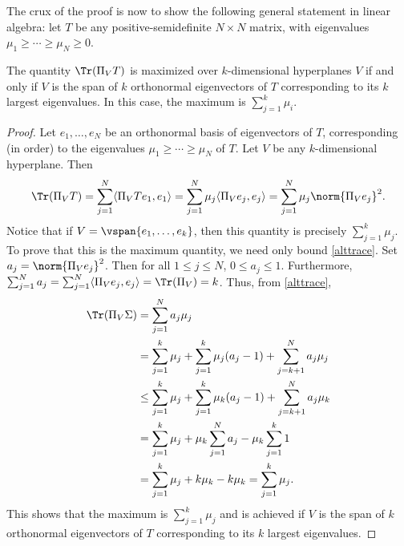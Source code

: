 \documentclass[12pt]{article}
\begin{document}
The crux of the proof is now to show the following general statement in linear algebra: let $T$ be any positive-semidefinite $N\times N$ matrix, with eigenvalues $\mu_1 \geq \cdots \geq \mu_N \geq 0$.
 \begin{prop} The quantity $\Tr(\Pi_V T)$ is maximized over $k$-dimensional hyperplanes $V$ if and only if $V$ is the span of $k$ orthonormal eigenvectors of $T$ corresponding to its $k$ largest eigenvalues. In this case, the maximum is $\sum_{j=1}^k \mu_i$.\end{prop}
 \begin{proof}
 Let $e_1,\ldots,e_N$ be an orthonormal basis of eigenvectors of $T$, corresponding (in order) to the eigenvalues $\mu_1 \geq \cdots \geq \mu_N$ of $T$. Let $V$ be any $k$-dimensional hyperplane. 
 Then 
 \begin{equation}\label{alttrace}\Tr(\Pi_V T) = \sum_{j=1}^N \langle \Pi_V T e_1,e_1\rangle = \sum_{j=1}^N \mu_j \langle \Pi_V e_j,e_j\rangle = \sum_{j=1}^N \mu_j\norm{\Pi_V e_j}^2.\end{equation} Notice that if $V = \vspan\{e_1,\ldots,e_k\}$, then this quantity is precisely $\sum_{j=1}^k \mu_j$. To prove that this is the maximum quantity, we need only bound \eqref{alttrace}. Set $a_j = \norm{\Pi_V e_j}^2$. Then for all $1 \leq j \leq N$, $0 \leq a_j \leq 1$. Furthermore, $\sum_{j=1}^N a_j = \sum_{j=1}^N\langle \Pi_V e_j,e_j\rangle = \Tr(\Pi_V) = k$.
 Thus, from \eqref{alttrace},
 \begin{align}
 \nonumber \Tr(\Pi_V \Sigma) &= \sum_{j=1}^N a_j\mu_j\\
 \nonumber &= \sum_{j=1}^k \mu_j + \sum_{j=1}^k \mu_j(a_j-1) + \sum_{j=k+1}^N a_j \mu_j\\
 \label{impline}&\leq \sum_{j=1}^k \mu_j + \sum_{j=1}^k \mu_k(a_j-1) + \sum_{j=k+1}^N a_j \mu_k\\
 \nonumber  &=\sum_{j=1}^k \mu_j  + \mu_k \sum_{j=1}^N a_j - \mu_k\sum_{j=1}^k 1\\
 \nonumber  &= \sum_{j=1}^k \mu_j  + k\mu_k - k\mu_k = \sum_{j=1}^k \mu_j.\end{align}
 This shows that the maximum is $\sum_{j=1}^k \mu_j$ and is achieved if $V$ is the span of $k$ orthonormal eigenvectors of $T$ corresponding to its $k$ largest eigenvalues.
 

\end{proof}
\end{document}
